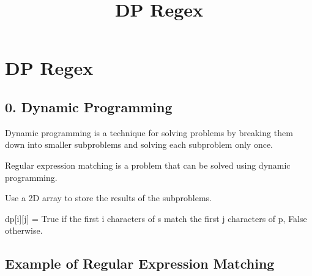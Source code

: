 \documentclass[
  letterpaper,
  DIV=11,
  numbers=noendperiod]{scrartcl}
\title{DP Regex}
\author{}
\date{}
\begin{document}
\maketitle


\section{DP Regex}\label{dp-regex}

\subsection{0. Dynamic Programming}\label{dynamic-programming}

Dynamic programming is a technique for solving problems by breaking them
down into smaller subproblems and solving each subproblem only once.

Regular expression matching is a problem that can be solved using
dynamic programming.

Use a 2D array to store the results of the subproblems.

dp{[}i{]}{[}j{]} = True if the first i characters of s match the first j
characters of p, False otherwise.

\subsection{Example of Regular Expression
Matching}\label{example-of-regular-expression-matching}
\end{document}
